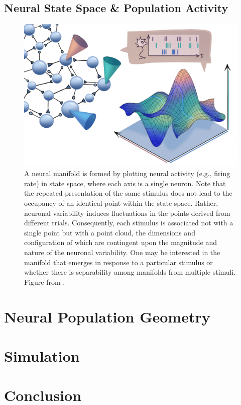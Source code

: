 \documentclass[11pt,a4paper]{article}
\begin{document}
\subsection{Neural State Space \& Population Activity}
\begin{figure}
    \centering
    \includegraphics[width=0.75\linewidth]{manifold_schematic.png}
    \caption{A neural manifold is formed by plotting neural activity (e.g., firing rate) in state space, where each axis is a single neuron. Note that the repeated presentation of the same stimulus does not lead to the occupancy of an identical point within the state space. Rather, neuronal variability induces fluctuations in the points derived from different trials. Consequently, each stimulus is associated not with a single point but with a point cloud, the dimensions and configuration of which are contingent upon the magnitude and nature of the neuronal variability. One may be interested in the manifold that emerges in response to a particular stimulus or whether there is separability among manifolds from multiple stimuli. Figure from \cite{Perich2024}.}
    \label{fig:manifolds}
\end{figure}


\section{Neural Population Geometry}

\section{Simulation}

\section{Conclusion}



\end{document}
